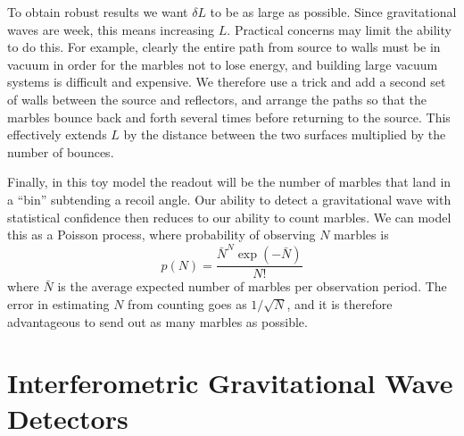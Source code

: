 To obtain robust results we want $\delta L$ to be as large as
possible.  Since gravitational waves are week, this means increasing
$L$.  Practical concerns may limit the ability to do this.  For
example, clearly the entire path from source to walls must be in
vacuum in order for the marbles not to lose energy, and building large
vacuum systems is difficult and expensive.  We therefore use a trick
and add a second set of walls between the source and reflectors, and
arrange the paths so that the marbles bounce back and forth several
times before returning to the source.  This effectively extends $L$ by
the distance between the two surfaces multiplied by the number of
bounces.

Finally, in this toy model the readout will be the number of marbles
that land in a ``bin'' subtending a recoil angle.  Our ability to
detect a gravitational wave with statistical confidence then reduces
to our ability to count marbles.  We can model this as a Poisson
process, where probability of observing $N$ marbles is 
%
\begin{equation*}
p(N) = \frac{\bar{N}^N \exp(-\bar{N})} {N!}
\end{equation*}
%
where $\bar{N}$ is the average expected number of marbles per
observation period.  The error in estimating $N$ from counting goes as
$1/\sqrt{N}$, and it is therefore advantageous to send out as many 
marbles as possible.

\section{Interferometric Gravitational Wave Detectors}

